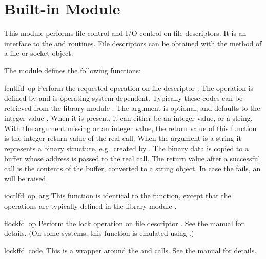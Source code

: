 \section{Built-in Module }

This module performs file control and I/O control on file descriptors.
It is an interface to the  and  \UNIX{} routines.
File descriptors can be obtained with the  method of a
file or socket object.

The module defines the following functions:


\begin{funcdesc}{fcntl}{fd\, op}
  Perform the requested operation on file descriptor .
  The operation is defined by  and is operating system
  dependent.  Typically these codes can be retrieved from the library
  module . The argument  is optional, and
  defaults to the integer value .  When
  it is present, it can either be an integer value, or a string.  With
  the argument missing or an integer value, the return value of this
  function is the integer return value of the real 
  call.  When the argument is a string it represents a binary
  structure, e.g.\ created by . The binary data is
  copied to a buffer whose address is passed to the real 
  call.  The return value after a successful call is the contents of
  the buffer, converted to a string object.  In case the
   fails, an  will be raised.
\end{funcdesc}

\begin{funcdesc}{ioctl}{fd\, op\, arg}
  This function is identical to the  function, except
  that the operations are typically defined in the library module
  .
\end{funcdesc}

\begin{funcdesc}{flock}{fd\, op}
Perform the lock operation  on file descriptor .
See the \UNIX{} manual for details.  (On some systems, this function is
emulated using .)
\end{funcdesc}

\begin{funcdesc}{lockf}{fd\, code\, }
This is a wrapper around the  and 
 calls.  See the \UNIX{} manual for details.
\end{funcdesc}

